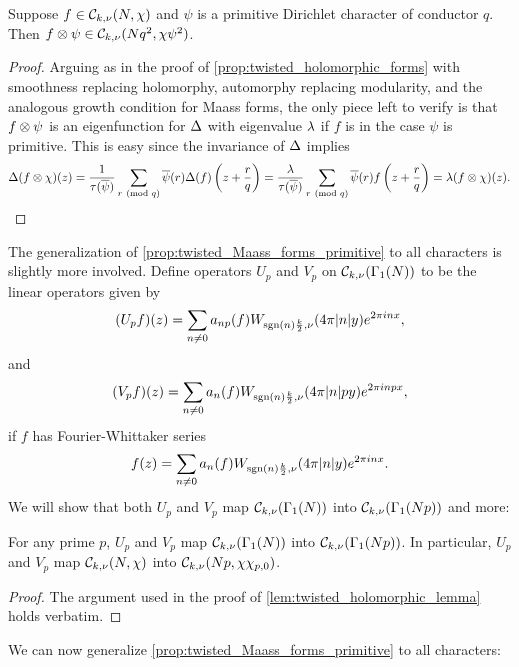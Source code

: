     \begin{proposition}\label{prop:twisted_Maass_forms_primitive}
      Suppose $f \in \mathcal{C}_{k,\nu}(N,\chi)$ and $\psi$ is a primitive Dirichlet character of conductor $q$. Then $f \otimes \psi \in \mathcal{C}_{k,\nu}(Nq^{2},\chi\psi^{2})$.
    \end{proposition}
    \begin{proof}
      Arguing as in the proof of \cref{prop:twisted_holomorphic_forms} with smoothness replacing holomorphy, automorphy replacing modularity, and the analogous growth condition for Maass forms, the only piece left to verify is that $f \otimes \psi$ is an eigenfunction for $\Delta$ with eigenvalue $\lambda$ if $f$ is in the case $\psi$ is primitive. This is easy since the invariance of $\Delta$ implies
      \[
        \Delta(f \otimes \chi)(z) = \frac{1}{\tau(\overline{\psi})}\sum_{r \ \left(\text{mod }q\right)}\overline{\psi}(r)\Delta(f)\left(z+\frac{r}{q}\right) =  \frac{\lambda}{\tau(\overline{\psi})}\sum_{r \ \left(\text{mod }q\right)}\overline{\psi}(r)f\left(z+\frac{r}{q}\right) = \lambda(f \otimes \chi)(z).
      \]
    \end{proof}

    The generalization of \cref{prop:twisted_Maass_forms_primitive} to all characters is slightly more involved. Define operators $U_{p}$ and $V_{p}$ on $\mathcal{C}_{k,\nu}(\Gamma_{1}(N))$ to be the linear operators given by
    \[
      (U_{p}f)(z) = \sum_{n \neq 0}a_{np}(f)W_{\operatorname{\mathrm{sgn}}(n)\frac{k}{2},\nu}(4\pi|n|y)e^{2\pi inx},
    \]
    and
    \[
      (V_{p}f)(z) = \sum_{n \neq 0}a_{n}(f)W_{\operatorname{\mathrm{sgn}}(n)\frac{k}{2},\nu}(4\pi|n|py)e^{2\pi inpx},
    \]
    if $f$ has Fourier-Whittaker series
    \[
      f(z) = \sum_{n \neq 0}a_{n}(f)W_{\operatorname{\mathrm{sgn}}(n)\frac{k}{2},\nu}(4\pi|n|y)e^{2\pi inx}.
    \]
    We will show that both $U_{p}$ and $V_{p}$ map $\mathcal{C}_{k,\nu}(\Gamma_{1}(N))$ into $\mathcal{C}_{k,\nu}(\Gamma_{1}(Np))$ and more:

    \begin{lemma}\label{lem:twisted_Maass_lemma}
      For any prime $p$, $U_{p}$ and $V_{p}$ map $\mathcal{C}_{k,\nu}(\Gamma_{1}(N))$ into $\mathcal{C}_{k,\nu}(\Gamma_{1}(Np))$. In particular, $U_{p}$ and $V_{p}$ map $\mathcal{C}_{k,\nu}(N,\chi)$ into $\mathcal{C}_{k,\nu}(Np,\chi\chi_{p,0})$.
    \end{lemma}
    \begin{proof}
      The argument used in the proof of \cref{lem:twisted_holomorphic_lemma} holds verbatim.
    \end{proof}

    We can now generalize \cref{prop:twisted_Maass_forms_primitive} to all characters:

